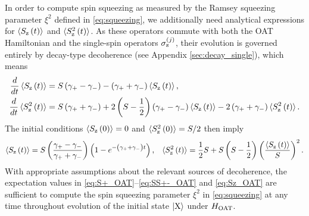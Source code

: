 In order to compute spin squeezing as measured by the Ramsey squeezing
parameter $\xi^2$ defined in \eqref{eq:squeezing}, we additionally
need analytical expressions for $\braket{S_{\text{z}}\left( t \right)}$ and
$\braket{S_{\text{z}}^2\left( t \right)}$.  As these operators commute with both the OAT
Hamiltonian and the single-spin operators $\sigma_{\text{z}}^{(j)}$, their
evolution is governed entirely by decay-type decoherence (see Appendix
\ref{sec:decay_single}), which means
\begin{align}
  \dfrac{d}{dt} \braket{S_{\text{z}}\left( t \right)}
  &= S\left( \gamma_+-\gamma_- \right) - \left( \gamma_++\gamma_- \right) \braket{S_{\text{z}}\left( t \right)},
  \\
  \dfrac{d}{dt} \braket{S_{\text{z}}^2\left( t \right)}
  &= S\left( \gamma_++\gamma_- \right)
  + 2\left( S-\dfrac{1}{2} \right)\left( \gamma_+-\gamma_- \right) \braket{S_{\text{z}}\left( t \right)}
  - 2 \left( \gamma_++\gamma_- \right) \braket{S_{\text{z}}^2\left( t \right)}.
\end{align}
The initial conditions $\braket{S_{\text{z}}\left( 0 \right)}=0$ and $\braket{S_{\text{z}}^2\left( 0 \right)}=S/2$
then imply
\begin{align}
  \braket{S_{\text{z}}\left( t \right)} = S\left( \dfrac{\gamma_+-\gamma_-}{\gamma_++\gamma_-} \right)
  \left( 1-e^{-\left( \gamma_+ + \gamma_- \right) t} \right),
  &&
  \braket{S_{\text{z}}^2\left( t \right)}
  = \dfrac{1}{2} S + S \left( S-\dfrac{1}{2} \right) \left( \dfrac{\braket{S_{\text{z}}\left( t \right)}}{S} \right)^2.
  \label{eq:Sz_OAT}
\end{align}
With appropriate assumptions about the relevant sources of
decoherence, the expectation values in
\eqref{eq:S+_OAT}--\eqref{eq:SS+-_OAT} and \eqref{eq:Sz_OAT} are
sufficient to compute the spin squeezing parameter $\xi^2$ in
\eqref{eq:squeezing} at any time throughout evolution of the initial
state $\ket{\text{X}}$ under $H_{\text{OAT}}$.
